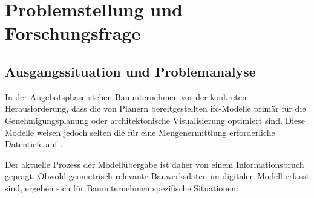 \section{Problemstellung und Forschungsfrage}
\label{sec:problem}


\subsection{Ausgangssituation und Problemanalyse}
\label{subsec:problem}

In der Angebotsphase stehen Bauunternehmen vor der konkreten Herausforderung, dass die von 
Planern bereitgestellten \gls{ifc}-Modelle primär für die Genehmigungsplanung oder 
architektonische Visualisierung optimiert sind. 
Diese Modelle weisen jedoch selten die für eine Mengenermittlung 
erforderliche Datentiefe auf \cite{sacks2018bim,borrmann2015building}. 

Der aktuelle Prozess der Modellübergabe ist daher von einem Informationsbruch geprägt. 
Obwohl geometrisch relevante Bauwerksdaten im digitalen Modell erfasst sind, ergeben sich 
für Bauunternehmen spezifische Situationen:


